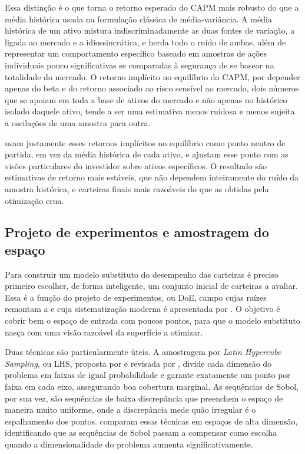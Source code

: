 \documentclass[12pt,a4paper]{article}
\begin{document}
Essa distinção é o que torna o retorno esperado do CAPM mais robusto do que a média histórica usada na formulação clássica de média-variância. A média histórica de um ativo mistura indiscriminadamente as duas fontes de variação, a ligada ao mercado e a idiossincrática, e herda todo o ruído de ambas, além de representar um comportamento específico baseado em amostras de ações individuais pouco significativas se comparadas à segurança de se basear na totalidade do mercado. O retorno implícito no equilíbrio do CAPM, por depender apenas do beta e do retorno associado ao risco sensível ao mercado, dois números que se apoiam em toda a base de ativos do mercado e não apenas no histórico isolado daquele ativo, tende a ser uma estimativa menos ruidosa e menos sujeita a oscilações de uma amostra para outra.

 usam justamente esses retornos implícitos no equilíbrio como ponto neutro de partida, em vez da média histórica de cada ativo, e ajustam esse ponto com as visões particulares do investidor sobre ativos específicos. O resultado são estimativas de retorno mais estáveis, que não dependem inteiramente do ruído da amostra histórica, e carteiras finais mais razoáveis do que as obtidas pela otimização crua.



\subsection{Projeto de experimentos e amostragem do espaço}
\label{sub: doe}
Para construir um modelo substituto do desempenho das carteiras é preciso primeiro escolher, de forma inteligente, um conjunto inicial de carteiras a avaliar. Essa é a função do projeto de experimentos, ou DoE, campo cujas raízes remontam a  e cuja sistematização moderna é apresentada por . O objetivo é cobrir bem o espaço de entrada com poucos pontos, para que o modelo substituto nasça com uma visão razoável da superfície a otimizar.

Duas técnicas são particularmente úteis. A amostragem por\textit{ Latin Hypercube Sampling}, ou LHS, proposta por  e revisada por , divide cada dimensão do problema em faixas de igual probabilidade e garante exatamente um ponto por faixa em cada eixo, assegurando boa cobertura marginal. As sequências de Sobol, por sua vez, são sequências de baixa discrepância que preenchem o espaço de maneira muito uniforme, onde a discrepância mede quão irregular é o espalhamento dos pontos.  comparam essas técnicas em espaços de alta dimensão, identificando que as sequências de Sobol passam a compensar como escolha quando a dimensionalidade do problema aumenta significativamente.
\end{document}
